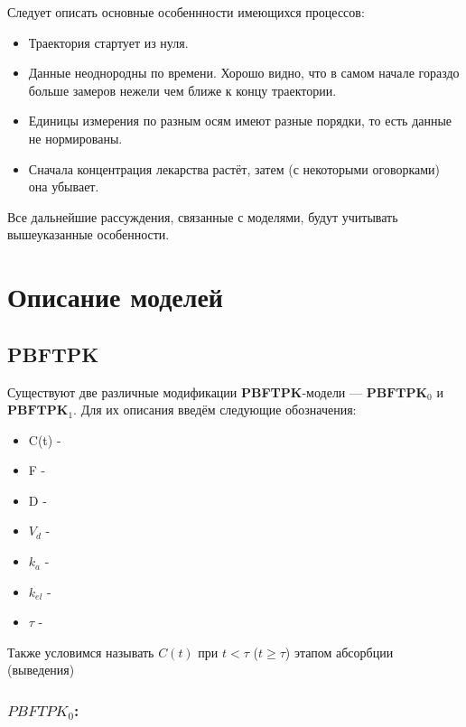 \documentclass[oneside,senior,etd]{BYUPhys}
\begin{document}
Следует описать основные особеннности имеющихся процессов:

\begin{itemize}
	\item Траектория стартует из нуля.
	\item Данные неоднородны по времени. Хорошо видно, что в самом начале гораздо больше замеров нежели чем ближе к концу траектории.
	\item Единицы измерения по разным осям имеют разные порядки, то есть данные не нормированы.
	\item Сначала концентрация лекарства растёт, затем (с некоторыми оговорками) она убывает.
\end{itemize}

Все дальнейшие рассуждения, связанные с моделями, будут учитывать вышеуказанные особенности.

\section{Описание моделей}

\subsection{PBFTPK}

Существуют две различные модификации \textbf{PBFTPK}-модели --- $\textbf{PBFTPK}_0$ и $\textbf{PBFTPK}_1$. Для их описания введём следующие обозначения:

\begin{itemize}
	\item C(t) - 
	\item F - 
	\item D - 
	\item $V_d$ - 
	\item $k_a$ - 
	\item $k_{el}$ - 
	\item $\tau$ - 
\end{itemize}

Также условимся называть $C(t)$ при $t < \tau$ ($t \ge \tau$) этапом абсорбции (выведения)

\subsubsection*{$PBFTPK_0$:}
\end{document}
